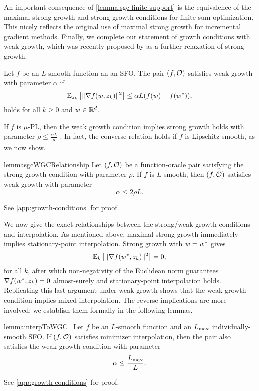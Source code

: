 An important consequence of \autoref{lemma:sgc-finite-support} is the equivalence of the maximal strong growth and strong growth conditions for finite-sum optimization.
This nicely reflects the original use of maximal strong growth for incremental gradient methods. 
Finally, we complete our statement of growth conditions with weak growth, which was recently proposed by \citet{vaswani2019fast} as a further relaxation of strong growth.
\begin{definition}\label{def:wgc}
    Let \( f \) be an \( L \)-smooth function an \oracle{} an \ac{SFO}. 
    The pair \( \rbr{f, \oracle{}} \) satisfies weak growth with parameter \(\alpha \) if
    \[ \Ek \sbr{\norm{\grad(\w, \zk)}^2} \leq \alpha L (f(\w) - f(\wopt)), \]
    holds for all \( k \geq 0 \) and \( \w \in \R^d\).
\end{definition}
\noindent If \( f \) is \( \mu \)-\ac{PL}, then the weak growth condition implies strong growth holds with parameter \( \rho \leq \frac{\alpha L}{\mu} \) \citep[Proposition 1]{vaswani2019fast}.
In fact, the converse relation holds if \( f \) is Lipschitz-smooth, as we now show.
\begin{restatable}{lemma}{sgcWGCRelationship}\label{lemma:sgc-wgc-relationship}
    Let \( \rbr{f, \oracle{}} \) be a function-oracle pair satisfying the strong growth condition with parameter \( \rho \).
    If \( f \) is \( L \)-smooth, then \( \rbr{f, \oracle{}} \) satisfies weak growth with parameter 
    \[ \alpha \leq 2 \rho L. \]
\end{restatable}     
\noindent See \autoref{app:growth-conditions} for proof.\hfill \break

We now give the exact relationships between the strong/weak growth conditions and interpolation.
As mentioned above, maximal strong growth immediately implies stationary-point interpolation.
Strong growth with \( \w = \wopt \) gives  
\[ \E_k\sbr{\norm{\grad(\wopt, \zk)}^2} = 0, \] 
for all \( k \), after which non-negativity of the Euclidean norm guarantees \( \grad(\wopt, \zk) = 0 \) almost-surely and stationary-point interpolation holds.
Replicating this last argument under weak growth shows that the weak growth condition implies mixed interpolation.
The reverse implications are more involved; we establish them formally in the following lemmas. 
\begin{restatable}{lemma}{interpToWGC}~\label{lemma:interpolation-to-wgc}
    Let \( f \) be an \( L \)-smooth function and \oracle{} an \( \Lmax \) individually-smooth \ac{SFO}.
    If \( \rbr{f, \oracle{}} \) satisfies minimizer interpolation, then the pair also satisfies the weak growth condition with parameter
    \[ \wgc \leq \frac{L_{\text{max}}}{L}. \]
\end{restatable}
\noindent See \autoref{app:growth-conditions} for proof. \hfill \break

